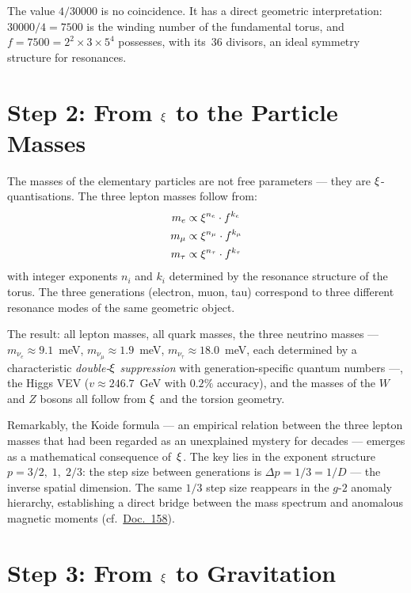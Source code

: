 The value $4/30000$ is no coincidence. It has a direct geometric interpretation: $30000/4 = 7500$ is the winding number of the fundamental torus, and $f = 7500 = 2^2 \times 3 \times 5^4$ possesses, with its~36 divisors, an ideal symmetry structure for resonances.

\section{Step 2: From $\xi$ to the Particle Masses}

The masses of the elementary particles are not free parameters --- they are $\xi$-quantisations. The three lepton masses follow from:
\begin{align}
m_e &\propto \xi^{n_e} \cdot f^{k_e} \\
m_\mu &\propto \xi^{n_\mu} \cdot f^{k_\mu} \\
m_\tau &\propto \xi^{n_\tau} \cdot f^{k_\tau}
\end{align}
with integer exponents $n_i$ and $k_i$ determined by the resonance structure of the torus. The three generations (electron, muon, tau) correspond to three different resonance modes of the same geometric object.

The result: all lepton masses, all quark masses, the three neutrino masses --- $m_{\nu_e} \approx 9.1$~meV, $m_{\nu_\mu} \approx 1.9$~meV, $m_{\nu_\tau} \approx 18.0$~meV, each determined by a characteristic \emph{double-$\xi$ suppression} with generation-specific quantum numbers ---, the Higgs VEV ($v \approx 246.7$~GeV with $0.2\%$ accuracy), and the masses of the $W$ and $Z$ bosons all follow from $\xi$ and the torsion geometry.

Remarkably, the Koide formula --- an empirical relation between the three lepton masses that had been regarded as an unexplained mystery for decades --- emerges as a mathematical consequence of~$\xi$. The key lies in the exponent structure $p = 3/2,\; 1,\; 2/3$: the step size between generations is $\Delta p = 1/3 = 1/D$ --- the inverse spatial dimension. The same $1/3$ step size reappears in the $g$-$2$ anomaly hierarchy, establishing a direct bridge between the mass spectrum and anomalous magnetic moments (cf.\ \href{https://github.com/jpascher/T0-Time-Mass-Duality/blob/main/2/pdf/158_T0_Koide-zu-g2-1_En.pdf}{Doc.~158}).

\section{Step 3: From $\xi$ to Gravitation}

